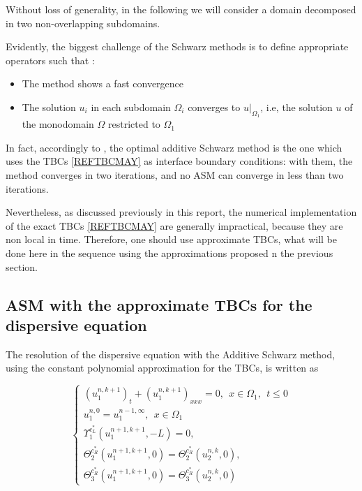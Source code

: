 


\indent Without loss of generality, in the following we will consider a domain decomposed in two non-overlapping subdomains.

\indent Evidently, the biggest challenge of the Schwarz methods is to define appropriate operators such that :

\begin{itemize}
\item The method shows a fast convergence
\item The solution $u_i$ in each subdomain $\Omega_i$ converges to $u|_{\Omega_1}$, i.e, the solution $u$ of the monodomain $\Omega$ restricted to $\Omega_1$
\end{itemize} 

\indent In fact, accordingly to \cite{Japhet2013}, the optimal additive Schwarz method is the one which uses the TBCs \ref{REFTBCMAY} as interface boundary conditions: with them, the method converges in two iterations, and no ASM can converge in less than two iterations.

\indent Nevertheless, as discussed previously in this report, the numerical implementation of the exact TBCs \ref{REFTBCMAY} are generally impractical, because they are non local in time. Therefore, one should use approximate TBCs, what will be done here in the sequence using the approximations proposed n the previous section.

\subsection{ASM with the approximate TBCs for the dispersive equation}

\indent The resolution of the dispersive equation with the Additive Schwarz method, using the constant polynomial approximation for the TBCs, is written as

\begin{equation}
    \label{eq:problemDDM1}
    \begin{cases}
        (u_1^{n,k+1})_t + (u_1^{n,k+1})_{xxx} = 0 , \ \ x \in \Omega_1, \ \ t \leq 0\\
        u_1^{n,0} = u_1^{n-1,\infty} , \ \ x \in \Omega_1 \\
        \Upsilon_1^{c_L^*}(u_1^{n+1,k+1},-L) = 0, \\ 
        \Theta_2^{c_R^*}(u_1^{n+1,k+1},0) = \Theta_2^{c_R^*}(u_2^{n,k},0) , \\
        \Theta_3^{c_R^*}(u_1^{n+1,k+1},0) = \Theta_3^{c_R^*}(u_2^{n,k},0)
     \end{cases}
\end{equation}

